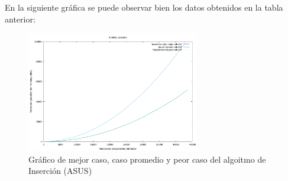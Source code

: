 \documentclass{homework}
\begin{document}
    En la siguiente gráfica se puede observar bien los datos obtenidos en la tabla anterior:

    \begin{figure}[H]
        \centering
        \label{asus:insercion-mp}
        \includegraphics[width=0.67\textwidth]{../data/asus-insercion-mp.pdf}
        \caption{Gráfico de mejor caso, caso promedio y peor caso del algoitmo de Inserción (ASUS)}
    \end{figure}
\end{document}

